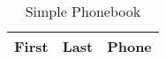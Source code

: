 \documentclass[11pt]{report}
\begin{document}
\begin{table}
    \centering
    \begin{tabular}{lcr}
    \hline
    
        \textbf{ First } 
        
           &
        
    
        \textbf{ Last } 
        
           &
        
    
        \textbf{ Phone } 
        
     
    \\
    \hline
    
    \hline
    \end{tabular}
    \caption{Simple Phonebook}
    \label{tab:phonebook}
\end{table}
\end{document}
